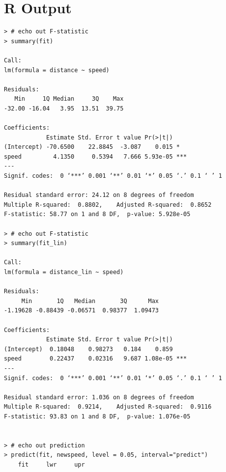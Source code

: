 \documentclass{article}
\begin{document}
\section*{R Output}
\begin{verbatim}
> # echo out F-statistic
> summary(fit)

Call:
lm(formula = distance ~ speed)

Residuals:
   Min     1Q Median     3Q    Max 
-32.00 -16.04   3.95  13.51  39.75 

Coefficients:
            Estimate Std. Error t value Pr(>|t|)    
(Intercept) -70.6500    22.8845  -3.087    0.015 *  
speed         4.1350     0.5394   7.666 5.93e-05 ***
---
Signif. codes:  0 ‘***’ 0.001 ‘**’ 0.01 ‘*’ 0.05 ‘.’ 0.1 ‘ ’ 1

Residual standard error: 24.12 on 8 degrees of freedom
Multiple R-squared:  0.8802,	Adjusted R-squared:  0.8652 
F-statistic: 58.77 on 1 and 8 DF,  p-value: 5.928e-05

> # echo out F-statistic
> summary(fit_lin)

Call:
lm(formula = distance_lin ~ speed)

Residuals:
     Min       1Q   Median       3Q      Max 
-1.19628 -0.88439 -0.06571  0.98377  1.09473 

Coefficients:
            Estimate Std. Error t value Pr(>|t|)    
(Intercept)  0.18048    0.98273   0.184    0.859    
speed        0.22437    0.02316   9.687 1.08e-05 ***
---
Signif. codes:  0 ‘***’ 0.001 ‘**’ 0.01 ‘*’ 0.05 ‘.’ 0.1 ‘ ’ 1

Residual standard error: 1.036 on 8 degrees of freedom
Multiple R-squared:  0.9214,	Adjusted R-squared:  0.9116 
F-statistic: 93.83 on 1 and 8 DF,  p-value: 1.076e-05


> # echo out prediction
> predict(fit, newspeed, level = 0.05, interval="predict")
    fit     lwr     upr
\end{verbatim}
\end{document}
